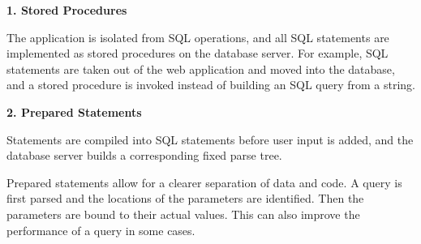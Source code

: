\textbf{1. Stored Procedures} 

The application is isolated from SQL operations, and all SQL statements are implemented as stored procedures on the database server. For example, SQL statements are taken out of the web application and moved into the database, and a stored procedure is invoked instead of building an SQL query from a string. 

\textbf{2. Prepared Statements} 

Statements are compiled into SQL statements before user input is added, and the database server builds a corresponding fixed parse tree. 

Prepared statements allow for a clearer separation of data and code. A query is first parsed and the locations of the parameters are identified. Then the parameters are bound to their actual values. This can also improve the performance of a query in some cases. 